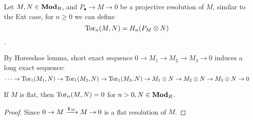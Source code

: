 \begin{definition}
  Let $M, N \in \mathbf{Mod}_R$, and $P_\bullet \to M \to 0$ be a projective resolution of $M$, 
  similar to the Ext case, for $n \ge 0$ we can define
  $$\operatorname{Tor}_n(M, N) = H_n(P_M \otimes N)$$.
\end{definition}

\begin{fact}
  By Horseshoe lemma, short exact sequence $0 \to M_1 \to M_2 \to M_3 \to 0$
  induces a long exact sequence:
  $$\cdots \to \operatorname{Tor}_1(M_1, N) \to \operatorname{Tor}_1(M_2, N) \to \operatorname{Tor}_1(M_3, N) \to 
  M_1 \otimes N \to M_2 \otimes N \to M_3 \otimes N \to 0$$
\end{fact}

\begin{prop}
  If $M$ is flat, then $\operatorname{Tor}_n(M, N) = 0$ for $n > 0, N \in \mathbf{Mod}_R$.
  \begin{proof}
    Since $0 \to M \xrightarrow{\mathbf{1}_M} M \to 0$ is a flat resolution of $M$. 
  \end{proof}
\end{prop}

